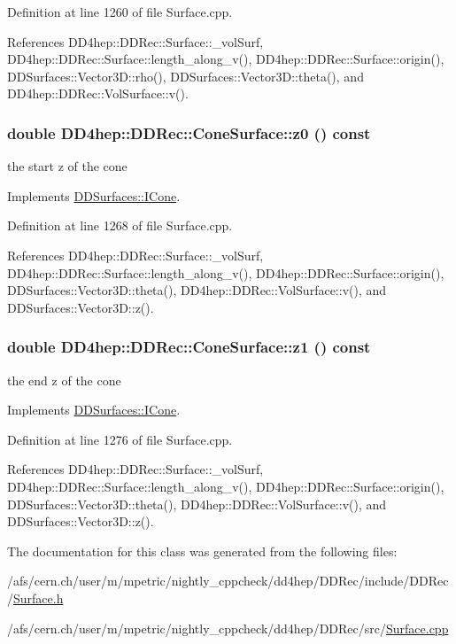 Definition at line 1260 of file Surface.cpp.

References DD4hep::DDRec::Surface::\_\-volSurf, DD4hep::DDRec::Surface::length\_\-along\_\-v(), DD4hep::DDRec::Surface::origin(), DDSurfaces::Vector3D::rho(), DDSurfaces::Vector3D::theta(), and DD4hep::DDRec::VolSurface::v().\hypertarget{class_d_d4hep_1_1_d_d_rec_1_1_cone_surface_a208dd6edd7dafbb3bbfd7208f5e54d77}{
\subsubsection[{z0}]{\setlength{\rightskip}{0pt plus 5cm}double DD4hep::DDRec::ConeSurface::z0 () const}}
\label{class_d_d4hep_1_1_d_d_rec_1_1_cone_surface_a208dd6edd7dafbb3bbfd7208f5e54d77}


the start z of the cone 

Implements \hyperlink{class_d_d_surfaces_1_1_i_cone_a306dd8443c146ce57ebf98f7f5c11013}{DDSurfaces::ICone}.

Definition at line 1268 of file Surface.cpp.

References DD4hep::DDRec::Surface::\_\-volSurf, DD4hep::DDRec::Surface::length\_\-along\_\-v(), DD4hep::DDRec::Surface::origin(), DDSurfaces::Vector3D::theta(), DD4hep::DDRec::VolSurface::v(), and DDSurfaces::Vector3D::z().\hypertarget{class_d_d4hep_1_1_d_d_rec_1_1_cone_surface_a57025cbc8425945bffdca2ded15530bf}{
\subsubsection[{z1}]{\setlength{\rightskip}{0pt plus 5cm}double DD4hep::DDRec::ConeSurface::z1 () const}}
\label{class_d_d4hep_1_1_d_d_rec_1_1_cone_surface_a57025cbc8425945bffdca2ded15530bf}


the end z of the cone 

Implements \hyperlink{class_d_d_surfaces_1_1_i_cone_a7bb86876e5f5196ea11ac78bcaa42dbc}{DDSurfaces::ICone}.

Definition at line 1276 of file Surface.cpp.

References DD4hep::DDRec::Surface::\_\-volSurf, DD4hep::DDRec::Surface::length\_\-along\_\-v(), DD4hep::DDRec::Surface::origin(), DDSurfaces::Vector3D::theta(), DD4hep::DDRec::VolSurface::v(), and DDSurfaces::Vector3D::z().

The documentation for this class was generated from the following files:\begin{DoxyCompactItemize}
\item 
/afs/cern.ch/user/m/mpetric/nightly\_\-cppcheck/dd4hep/DDRec/include/DDRec/\hyperlink{_surface_8h}{Surface.h}\item 
/afs/cern.ch/user/m/mpetric/nightly\_\-cppcheck/dd4hep/DDRec/src/\hyperlink{_surface_8cpp}{Surface.cpp}\end{DoxyCompactItemize}
